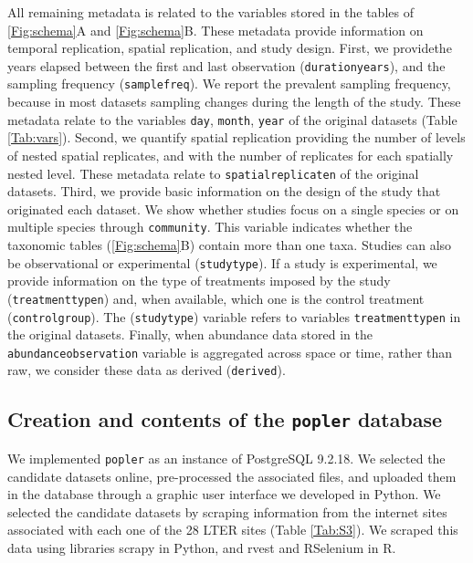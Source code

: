 \documentclass{article}\usepackage[]{graphicx}\usepackage[]{color}
\begin{document}
All remaining metadata is related to the variables stored in the tables of \ref{Fig:schema}A and \ref{Fig:schema}B. These metadata provide information on temporal replication, spatial replication, and study design. First, we providethe years elapsed between the first and last observation (\texttt{duration\textunderscore years}), and the sampling frequency (\texttt{samplefreq}). We report the prevalent sampling frequency, because in most datasets sampling changes during the length of the study. These metadata relate to the variables \texttt{day}, \texttt{month}, \texttt{year} of the original datasets (Table \ref{Tab:vars}). Second, we quantify spatial replication providing the number of levels of nested spatial replicates, and with the number of replicates for each spatially nested level. These metadata relate to \texttt{spatial\textunderscore replicate\textunderscore n} of the original datasets. Third, we provide basic information on the design of the study that originated each dataset. We show whether studies focus on a single species or on multiple species through \texttt{community}. This variable indicates whether the taxonomic tables (\ref{Fig:schema}B) contain more than one taxa. Studies can also be observational or experimental (\texttt{studytype}). If a study is experimental, we provide information on the type of treatments imposed by the study (\texttt{treatment\textunderscore type\textunderscore n}) and, when available, which one is the control treatment (\texttt{control\textunderscore group}). The (\texttt{studytype}) variable refers to variables \texttt{treatment\textunderscore type\textunderscore n} in the original datasets. Finally, when abundance data stored in the \texttt{abundance\textunderscore observation} variable is aggregated across space or time, rather than raw, we consider these data as derived (\texttt{derived}).

\subsection*{Creation and contents of the \texttt{popler} database}
We implemented \texttt{popler} as an instance of PostgreSQL 9.2.18. We selected the candidate datasets online, pre-processed the associated files, and uploaded them in the database through a graphic user interface we developed in Python. We selected the candidate datasets by scraping information from the internet sites associated with each one of the 28 LTER sites (Table \ref{Tab:S3}). We scraped this data using libraries scrapy in Python, and rvest and RSelenium in R.
\end{document}
